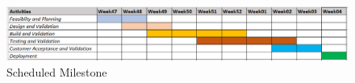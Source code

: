 \label{sec:milestone}
\begin{figure}
	\centering
	\includegraphics[width=1.2\linewidth]{images/milestone.png}
	\caption{Scheduled Milestone}
\end{figure} 
